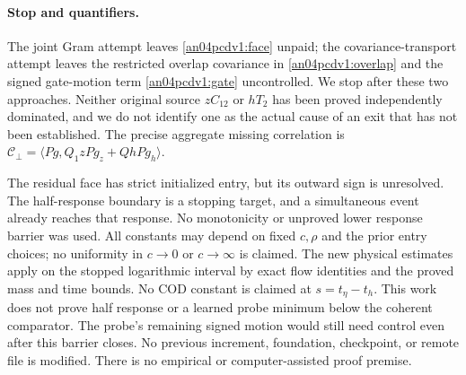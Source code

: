 \documentclass[11pt]{article}
\begin{document}
\paragraph{Stop and quantifiers.}
The joint Gram attempt leaves \eqref{an04pcdv1:face} unpaid;
the covariance-transport attempt leaves the restricted overlap
covariance in \eqref{an04pcdv1:overlap} and the signed gate-motion
term \eqref{an04pcdv1:gate} uncontrolled. We stop after these two
approaches. Neither original source $zC_{12}$ or $hT_2$ has been
proved independently dominated, and we do not identify one as
the actual cause of an exit that has not been established.
The precise aggregate missing correlation is
$\mathcal C_\perp=\langle Pg,Q_1zPg_z+QhPg_h\rangle$.

The residual face has strict initialized entry, but its outward
sign is unresolved. The half-response boundary is a stopping
target, and a simultaneous event already reaches that response.
No monotonicity or unproved lower response barrier was used.
All constants may depend on fixed $c,\rho$ and the prior entry
choices; no uniformity in $c\to0$ or $c\to\infty$ is claimed.
The new physical estimates apply on the stopped logarithmic
interval by exact flow identities and the proved mass and time
bounds. No COD constant is claimed at $s=t_\eta-t_h$.
This work does not prove half response or a learned probe minimum
below the coherent comparator. The probe's remaining signed
motion would still need control even after this barrier closes.
No previous increment, foundation, checkpoint, or remote file is
modified. There is no empirical or computer-assisted proof premise.
\end{document}
